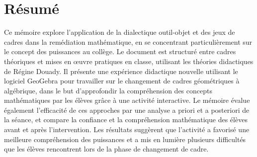 \section*{Résumé}

Ce mémoire explore l'application de la dialectique outil-objet et des jeux de cadres dans la remédiation mathématique,
en se concentrant particulièrement sur le concept des puissances au collège.
Le document est structuré entre cadres théoriques et mises en œuvre pratiques en classe,
utilisant les théories didactiques de Régine Douady.
Il présente une expérience didactique nouvelle utilisant le logiciel GeoGebra pour travailler sur le changement de cadres géométriques à algébrique,
dans le but d'approfondir la compréhension des concepts mathématiques par les élèves grâce à une activité interactive.
Le mémoire évalue également l'efficacité de ces approches par une analyse a priori et a posteriori de la séance,
et compare la confiance et la compréhension mathématique des élèves avant et après l'intervention.
Les résultats suggèrent que l'activité a favorisé une meilleure compréhension des puissances et a mis en lumière plusieurs difficultés que les élèves rencontrent lors de la phase de changement de cadre.